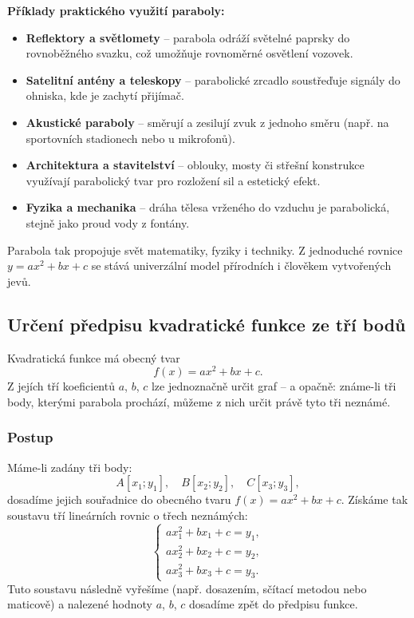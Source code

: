 \documentclass[12pt,a4paper]{article}
\begin{document}
\begin{historicalbox}
\textbf{Příklady praktického využití paraboly:}

\begin{itemize}
  \item \textbf{Reflektory a světlomety} – parabola odráží světelné paprsky do rovnoběžného svazku, což umožňuje rovnoměrné osvětlení vozovek.
  \item \textbf{Satelitní antény a teleskopy} – parabolické zrcadlo soustřeďuje signály do ohniska, kde je zachytí přijímač.
  \item \textbf{Akustické paraboly} – směrují a zesilují zvuk z jednoho směru (např. na sportovních stadionech nebo u mikrofonů).
  \item \textbf{Architektura a stavitelství} – oblouky, mosty či střešní konstrukce využívají parabolický tvar pro rozložení sil a estetický efekt.
  \item \textbf{Fyzika a mechanika} – dráha tělesa vrženého do vzduchu je parabolická, stejně jako proud vody z fontány.
\end{itemize}

\medskip
Parabola tak propojuje svět matematiky, fyziky i techniky.  
Z jednoduché rovnice \(y = ax^2 + bx + c\) se stává univerzální model přírodních i člověkem vytvořených jevů.
\end{historicalbox}



\subsection{Určení předpisu kvadratické funkce ze tří bodů}

Kvadratická funkce má obecný tvar
\[
f(x) = ax^2 + bx + c.
\]
Z jejích tří koeficientů \(a\), \(b\), \(c\) lze jednoznačně určit graf – a opačně:  
známe-li tři body, kterými parabola prochází, můžeme z nich určit právě tyto tři neznámé.


\subsubsection*{Postup}

Máme-li zadány tři body:
\[
A[x_1; y_1], \quad B[x_2; y_2], \quad C[x_3; y_3],
\]
dosadíme jejich souřadnice do obecného tvaru \(f(x) = ax^2 + bx + c\).  
Získáme tak soustavu tří lineárních rovnic o třech neznámých:
\[
\begin{cases}
a x_1^2 + b x_1 + c = y_1,\\
a x_2^2 + b x_2 + c = y_2,\\
a x_3^2 + b x_3 + c = y_3.
\end{cases}
\]
Tuto soustavu následně vyřešíme (např. dosazením, sčítací metodou nebo maticově) a nalezené hodnoty \(a\), \(b\), \(c\) dosadíme zpět do předpisu funkce.
\end{document}

